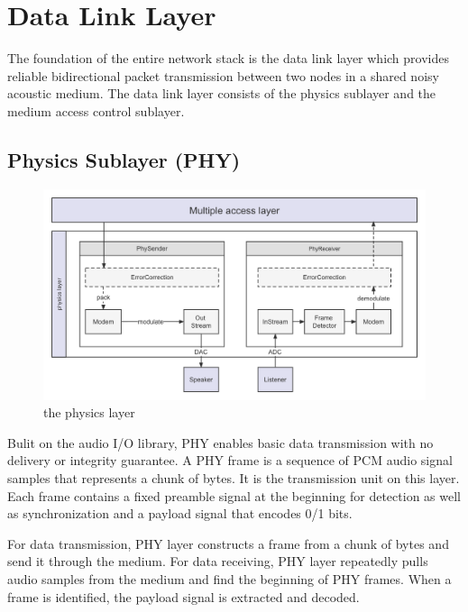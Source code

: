 \section{Data Link Layer}
The foundation of the entire network stack is the data link layer which
provides reliable bidirectional packet transmission between two nodes in a shared noisy acoustic medium.
The data link layer consists of the physics sublayer and the medium access control sublayer.

\subsection{Physics Sublayer (PHY)}
\begin{figure}[h]
  \begin{center}
    \centerline{\includegraphics[width=\columnwidth]{./figures/Phylayer.png}}
    \caption{the physics layer}
    \label{physics}
  \end{center}
\end{figure}
Bulit on the audio I/O library, PHY enables basic data transmission with no delivery or integrity guarantee.
A PHY frame is a sequence of PCM audio signal samples that represents a chunk of bytes. It is the transmission unit on this layer.
Each frame contains a fixed preamble signal at the beginning for detection as well as synchronization and a payload signal that encodes 0/1 bits.\par
For data transmission, PHY layer constructs a frame from a chunk of bytes and send it through the medium.
For data receiving, PHY layer repeatedly pulls audio samples from the medium and find the beginning of PHY frames.
When a frame is identified, the payload signal is extracted and decoded.
